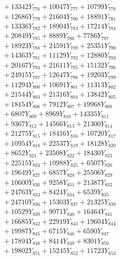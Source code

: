 \documentclass[a4paper,10pt]{article}
\begin{document}
{\begin{align}
&\;  + 13342 Y_{776} + 10047 Y_{777} + 10799 Y_{778} \\[0.5ex]\allowbreak
&\;  + 12686 Y_{779} + 21604 Y_{780} + 18891 Y_{781} \\[0.3ex]
&\;  + 13336 Y_{782} + 18904 Y_{783} + 17214 Y_{784} \\[0.3ex]
&\;  + 20849 Y_{785} + 8889 Y_{786} + 7786 Y_{787} \\[0.3ex]
&\;  + 18923 Y_{788} + 24591 Y_{789} + 25351 Y_{790} \\[0.3ex]
&\;  + 14363 Y_{791} + 11129 Y_{792} + 12880 Y_{793} \\[0.3ex]
&\;  + 20167 Y_{794} + 21611 Y_{795} + 15132 Y_{796} \\[0.3ex]
&\;  + 24915 Y_{797} + 12647 Y_{798} + 19203 Y_{799} \\[0.3ex]
&\;  + 11294 Y_{800} + 10691 Y_{801} + 11313 Y_{802} \\[0.3ex]
&\;  + 21544 Y_{803} + 21316 Y_{804} + 13842 Y_{805} \\[0.3ex]
&\;  + 18154 Y_{806} + 7912 Y_{807} + 19968 Y_{808} \\[0.5ex]\allowbreak
&\;  + 6807 Y_{809} + 8969 Y_{810} + 14335 Y_{811} \\[0.3ex]
&\;  + 9367 Y_{812} + 14566 Y_{813} + 21300 Y_{814} \\[0.3ex]
&\;  + 21275 Y_{815} + 18416 Y_{816} + 10720 Y_{817} \\[0.3ex]
&\;  + 10954 Y_{818} + 22537 Y_{819} + 18128 Y_{820} \\[0.3ex]
&\;  + 8652 Y_{821} + 23508 Y_{822} + 18430 Y_{823} \\[0.3ex]
&\;  + 22515 Y_{824} + 10988 Y_{825} + 6507 Y_{826} \\[0.3ex]
&\;  + 19649 Y_{827} + 6857 Y_{828} + 25506 Y_{829} \\[0.3ex]
&\;  + 10600 Y_{830} + 9258 Y_{831} + 21387 Y_{832} \\[0.3ex]
&\;  + 24763 Y_{833} + 8424 Y_{834} + 6539 Y_{835} \\[0.3ex]
&\;  + 24710 Y_{836} + 15303 Y_{837} + 21325 Y_{838} \\[0.5ex]\allowbreak
&\;  + 10529 Y_{839} + 9071 Y_{840} + 16464 Y_{841} \\[0.3ex]
&\;  + 16685 Y_{842} + 22919 Y_{843} + 19604 Y_{844} \\[0.3ex]
&\;  + 19987 Y_{845} + 6715 Y_{846} + 6590 Y_{847} \\[0.3ex]
&\;  + 17894 Y_{848} + 8414 Y_{849} + 8301 Y_{850} \\[0.3ex]
&\;  + 19802 Y_{851} + 15245 Y_{852} + 11723 Y_{853} \\[0.3ex]

\end{align}}
\end{document}
